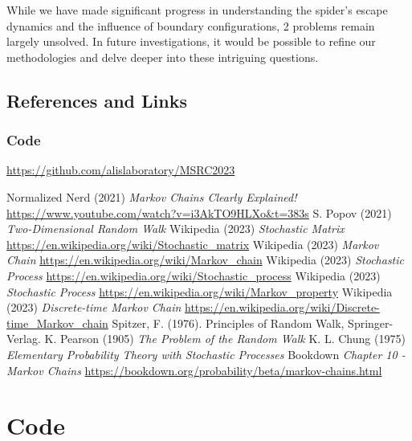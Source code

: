 \documentclass[12pt,a4paper]{article}
\begin{document}
While we have made significant progress in understanding the spider's escape dynamics and the influence of boundary configurations, 2 problems remain largely unsolved. In future investigations, it would be possible to refine our methodologies and delve deeper into these intriguing questions.

\subsection{References and Links}

\subsubsection{Code}
\url{https://github.com/alislaboratory/MSRC2023}


\begin{thebibliography}{9}
Normalized Nerd (2021) \emph{Markov Chains Clearly Explained!} \url{https://www.youtube.com/watch?v=i3AkTO9HLXo&t=383s}
S. Popov (2021) \emph{Two-Dimensional Random Walk}
Wikipedia (2023) \emph{Stochastic Matrix} \url{https://en.wikipedia.org/wiki/Stochastic_matrix}
Wikipedia (2023) \emph{Markov Chain} \url{https://en.wikipedia.org/wiki/Markov_chain}
Wikipedia (2023) \emph{Stochastic Process} \url{https://en.wikipedia.org/wiki/Stochastic_process}
Wikipedia (2023) \emph{Stochastic Process} \url{https://en.wikipedia.org/wiki/Markov_property}
Wikipedia (2023) \emph{Discrete-time Markov Chain} \url{https://en.wikipedia.org/wiki/Discrete-time_Markov_chain}
Spitzer, F. (1976). Principles of Random Walk, Springer-Verlag.
K. Pearson (1905) \emph{The Problem of the Random Walk}
K. L. Chung (1975) 
\emph{Elementary Probability Theory with Stochastic Processes}
Bookdown \emph{Chapter 10 - Markov Chains} \url{https://bookdown.org/probability/beta/markov-chains.html}
\end{thebibliography}

\section{Code}
\end{document}
